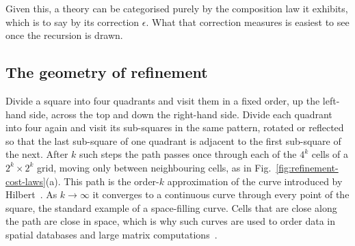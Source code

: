 Given this, a theory can be categorised purely by the composition law it
exhibits, which is to say by its correction $\epsilon$. What that
correction measures is easiest to see once the recursion is drawn.

\subsection*{The geometry of refinement}
\label{subsec:geometry-of-refinement}
Divide a square into four quadrants and visit them in a fixed order, up
the left-hand side, across the top and down the right-hand side. Divide
each quadrant into four again and visit its sub-squares in the same
pattern, rotated or reflected so that the last sub-square of one
quadrant is adjacent to the first sub-square of the next. After $k$
such steps the path passes once through each of the $4^k$ cells of a
$2^k\times2^k$ grid, moving only between neighbouring cells, as in
Fig.~\ref{fig:refinement-cost-laws}(a). This path is the order-$k$
approximation of the curve introduced by
Hilbert~\cite{hilbert1891stetige}. As $k\to\infty$ it converges to a
continuous curve through every point of the square, the standard
example of a space-filling curve. Cells that are close along the path
are close in space, which is why such curves are used to order data in
spatial databases and large matrix
computations~\cite{haverkort2011inventory}.

